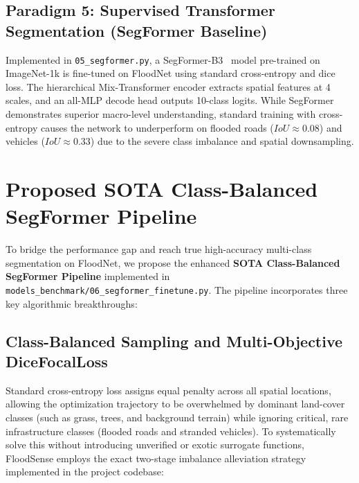 \subsection{Paradigm 5: Supervised Transformer Segmentation (SegFormer Baseline)}
Implemented in \texttt{05\_segformer.py}, a SegFormer-B3~\cite{xie2021segformer} model pre-trained on ImageNet-1k is fine-tuned on FloodNet using standard cross-entropy and dice loss. The hierarchical Mix-Transformer encoder extracts spatial features at 4 scales, and an all-MLP decode head outputs 10-class logits. While SegFormer demonstrates superior macro-level understanding, standard training with cross-entropy causes the network to underperform on flooded roads ($IoU \approx 0.08$) and vehicles ($IoU \approx 0.33$) due to the severe class imbalance and spatial downsampling.

\section{Proposed SOTA Class-Balanced SegFormer Pipeline}
To bridge the performance gap and reach true high-accuracy multi-class segmentation on FloodNet, we propose the enhanced \textbf{SOTA Class-Balanced SegFormer Pipeline} implemented in \texttt{models\_benchmark/06\_segformer\_finetune.py}. The pipeline incorporates three key algorithmic breakthroughs:

\subsection{Class-Balanced Sampling and Multi-Objective DiceFocalLoss}
Standard cross-entropy loss assigns equal penalty across all spatial locations, allowing the optimization trajectory to be overwhelmed by dominant land-cover classes (such as grass, trees, and background terrain) while ignoring critical, rare infrastructure classes (flooded roads and stranded vehicles). To systematically solve this without introducing unverified or exotic surrogate functions, FloodSense employs the exact two-stage imbalance alleviation strategy implemented in the project codebase:

